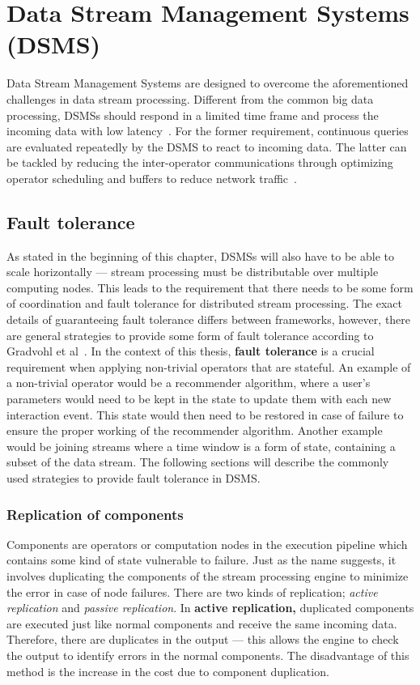 \section{Data Stream Management Systems (DSMS)} 
Data Stream Management Systems are designed to overcome the aforementioned challenges 
in data stream processing. Different from the common big data processing, DSMSs should
respond in a limited time frame and process the incoming data with low latency~\cite{data_stream_management}. 
For the former requirement, continuous queries are evaluated repeatedly by the DSMS to react 
to incoming data. The latter can be tackled by reducing the inter-operator communications 
through optimizing operator scheduling and buffers to reduce network traffic~\cite{low_latency_data_stream}. 



\subsection{Fault tolerance}
As stated in the beginning of this chapter, DSMSs will also have to be able to scale 
horizontally --- stream processing must be distributable over multiple computing nodes. 
This leads to the requirement that there needs to be some form of coordination and fault tolerance 
for distributed stream processing. The exact details of guaranteeing fault tolerance differs between frameworks, however, there are general strategies to provide some 
form of fault tolerance according to Gradvohl et al~\cite{fault_tolerance_dsms}.
In the context of this thesis, \textbf{fault tolerance} is a crucial requirement when applying
non-trivial operators that are stateful. 
An example of a non-trivial operator would be a recommender algorithm, where 
a user's parameters would need to be kept in the state to update them with each new 
interaction event. This state would then need to be restored in case of failure to 
ensure the proper working of the recommender algorithm.
Another example would be joining streams where a time window is a form of state, 
containing a subset of the data stream. 
The following sections will describe the commonly used strategies to provide fault tolerance 
in DSMS. 

\subsubsection{Replication of components}
Components are operators or computation nodes in the execution pipeline which contains 
some kind of state vulnerable to failure. 
Just as the name suggests, it involves duplicating the components of the stream processing
engine to minimize the error in case of node failures. There are two kinds of replication; 
\emph{active replication} and \emph{passive replication}. In \textbf{active replication,}
duplicated components are executed just like normal components and receive the same incoming data. 
Therefore, there are duplicates in the output --- this allows the engine to check the 
output to identify errors in the normal components. The disadvantage of this method is 
the increase in the cost due to component duplication. 

